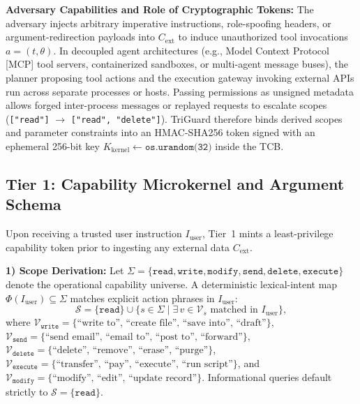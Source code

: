 \documentclass[conference]{IEEEtran}
\begin{document}
\textbf{Adversary Capabilities and Role of Cryptographic Tokens:} The adversary injects arbitrary imperative instructions, role-spoofing headers, or argument-redirection payloads into $C_{\text{ext}}$ to induce unauthorized tool invocations $a = (t, \theta)$. In decoupled agent architectures (e.g., Model Context Protocol [MCP] tool servers, containerized sandboxes, or multi-agent message buses), the planner proposing tool actions and the execution gateway invoking external APIs run across separate processes or hosts. Passing permissions as unsigned metadata allows forged inter-process messages or replayed requests to escalate scopes (\texttt{["read"]} $\to$ \texttt{["read", "delete"]}). TriGuard therefore binds derived scopes and parameter constraints into an HMAC-SHA256 token signed with an ephemeral 256-bit key $K_{\text{kernel}} \leftarrow \texttt{os.urandom(32)}$ inside the TCB.

\subsection{Tier 1: Capability Microkernel and Argument Schema}
Upon receiving a trusted user instruction $I_{\text{user}}$, Tier~1 mints a least-privilege capability token prior to ingesting any external data $C_{\text{ext}}$.

\textbf{1) Scope Derivation:} Let $\Sigma = \{\texttt{read}, \texttt{write}, \texttt{modify}, \texttt{send}, \texttt{delete}, \texttt{execute}\}$ denote the operational capability universe. A deterministic lexical-intent map $\Phi(I_{\text{user}}) \subseteq \Sigma$ matches explicit action phrases in $I_{\text{user}}$:
\begin{equation}
\mathcal{S} = \{\texttt{read}\} \cup \{s \in \Sigma \mid \exists\, v \in \mathcal{V}_s \text{ matched in } I_{\text{user}}\},
\end{equation}
where $\mathcal{V}_{\texttt{write}} = \{\text{``write to'', ``create file'', ``save into'', ``draft''}\}$, $\mathcal{V}_{\texttt{send}} = \{\text{``send email'', ``email to'', ``post to'', ``forward''}\}$, $\mathcal{V}_{\texttt{delete}} = \{\text{``delete'', ``remove'', ``erase'', ``purge''}\}$, $\mathcal{V}_{\texttt{execute}} = \{\text{``transfer'', ``pay'', ``execute'', ``run script''}\}$, and $\mathcal{V}_{\texttt{modify}} = \{\text{``modify'', ``edit'', ``update record''}\}$. Informational queries default strictly to $\mathcal{S} = \{\texttt{read}\}$.
\end{document}
